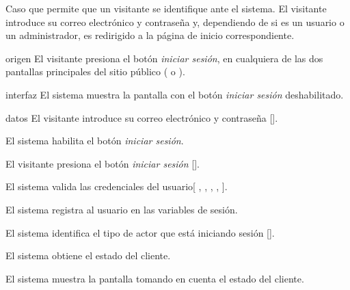 %
%

{
  Caso que permite que un visitante se identifique ante el sistema. El
  visitante introduce su correo electrónico y contraseña y, dependiendo de
  si es un usuario o un administrador, es redirigido a la página de
  inicio correspondiente.

  \begin{trayectoriaPrincipal}

    \item[origen] El visitante presiona el botón \textit{iniciar sesión}, en
      cualquiera de las dos pantallas principales del sitio público
      ( o ).

    \item[interfaz] El sistema muestra la pantalla
       con el botón \textit{iniciar sesión}
      deshabilitado.

    \item[datos] El visitante introduce su correo electrónico y contraseña
      [].

    \item El sistema habilita el botón \textit{iniciar sesión}.

    \item El visitante presiona el botón \textit{iniciar sesión}
      [].

    \item El sistema valida las credenciales del usuario[
      ,
      ,
      ,
      ,
      ].

    \item El sistema registra al usuario en las variables de sesión.

    \item El sistema identifica el tipo de actor que está iniciando
      sesión [].

    \item El sistema obtiene el estado del cliente.

    \item El sistema muestra la pantalla
       tomando en cuenta el estado
      del cliente.


\end{trayectoriaPrincipal}}
